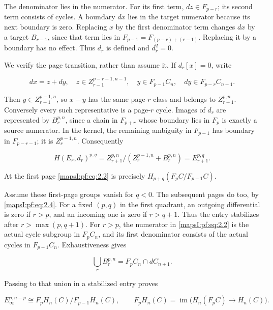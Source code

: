 \documentclass[11pt]{article}
\begin{document}
The denominator lies in the numerator. For its first term, \(dz\in F_{p-r}\); its second term consists of cycles. A boundary \(dx\) lies in the target numerator because its next boundary is zero. Replacing \(x\) by the first denominator term changes \(dx\) by a target \(B_{r-1}\), since that term lies in \(F_{p-1}=F_{(p-r)+(r-1)}\). Replacing it by a boundary has no effect. Thus \(d_r\) is defined and \(d_r^2=0\).

We verify the page transition, rather than assume it. If \(d_r[x]=0\), write

\begin{equation}
dx=z+dy,\quad
z\in Z_{r-1}^{p-r-1,n-1},\quad
y\in F_{p-1}C_n,\quad dy\in F_{p-r}C_{n-1}.
\label{mapsI:pf:eq:2.3}
\end{equation}

Then \(y\in Z_{r-1}^{p-1,n}\), so \(x-y\) has the same page-\(r\) class and belongs to \(Z_{r+1}^{p,n}\). Conversely every such representative is a page-\(r\) cycle. Images of \(d_r\) are represented by \(B_r^{p,n}\), since a chain in \(F_{p+r}\) whose boundary lies in \(F_p\) is exactly a source numerator. In the kernel, the remaining ambiguity in \(F_{p-1}\) has boundary in \(F_{p-r-1}\); it is \(Z_r^{p-1,n}\). Consequently

\begin{equation}
H(E_r,d_r)^{p,q}
=Z_{r+1}^{p,n}/(Z_r^{p-1,n}+B_r^{p,n})
=E_{r+1}^{p,q}.
\label{mapsI:pf:eq:2.4}
\end{equation}

At the first page \eqref{mapsI:pf:eq:2.2} is precisely \(H_{p+q}(F_pC/F_{p-1}C)\).

Assume these first-page groups vanish for \(q<0\). The subsequent pages do too, by \eqref{mapsI:pf:eq:2.4}. For a fixed \((p,q)\) in the first quadrant, an outgoing differential is zero if \(r>p\), and an incoming one is zero if \(r>q+1\). Thus the entry stabilizes after \(r>\max(p,q+1)\). For \(r>p\), the numerator in \eqref{mapsI:pf:eq:2.2} is the actual cycle subgroup in \(F_pC_n\), and its first denominator consists of the actual cycles in \(F_{p-1}C_n\). Exhaustiveness gives

\begin{equation}
\bigcup_r B_r^{p,n}=F_pC_n\cap dC_{n+1}.
\label{mapsI:pf:eq:2.5}
\end{equation}

Passing to that union in a stabilized entry proves

\begin{equation}
E_\infty^{p,n-p}\cong F_pH_n(C)/F_{p-1}H_n(C),
\qquad
F_pH_n(C)=\operatorname{im}\bigl(H_n(F_pC)\to H_n(C)\bigr).
\label{mapsI:pf:eq:2.6}
\end{equation}
\end{document}
